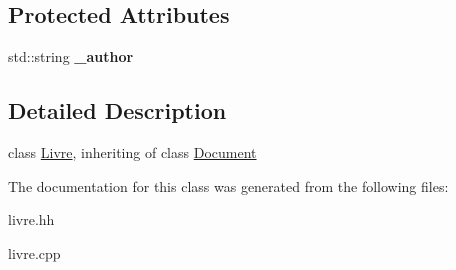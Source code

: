 \subsection*{Protected Attributes}
\begin{DoxyCompactItemize}
\item 
\hypertarget{classLivre_a866cdec9063d1caef41471646046dfdf}{
std::string {\bfseries \_\-author}}
\label{classLivre_a866cdec9063d1caef41471646046dfdf}

\end{DoxyCompactItemize}


\subsection{Detailed Description}
class \hyperlink{classLivre}{Livre}, inheriting of class \hyperlink{classDocument}{Document} 

The documentation for this class was generated from the following files:\begin{DoxyCompactItemize}
\item 
livre.hh\item 
livre.cpp\end{DoxyCompactItemize}
